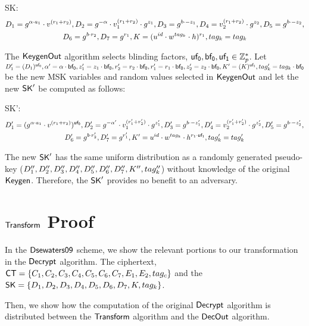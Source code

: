 \documentclass[11pt]{article}
\begin{document}
\begin{description}
\item {\sf SK}: \begin{multline*}  \originalkey \end{multline*}
\end{description}

\noindent
The $\KeygenOut$ algorithm selects blinding factors, $\listofbfs \in \Zp^*$. Let $\keydefinitions$ be the new MSK variables and random values selected in $\KeygenOut$ and let the new $\SK'$ be computed as follows:

\begin{description}
\item {\sf SK'}: \begin{multline*}  \transformkey \end{multline*}
\end{description}

\noindent
The new $\SK'$ has the same uniform distribution as a randomly generated pseudo-key ($\pseudokey$) without knowledge of the original $\Keygen$. Therefore, the $\SK'$ provides no benefit to an adversary.

\section{$\Transform$ Proof}

In the ${\schemename}$ scheme, we show the relevant portions to our transformation in the $\Decrypt$ algorithm. The ciphertext, $\CT = \{\ciphertext\}$ and the $\SK = \{\secretkey\}$. 

\gutsofdecrypt

Then, we show how the computation of the original $\Decrypt$ algorithm is distributed between the $\Transform$ algorithm and the $\Decout$ algorithm.

\gutsoftransform
\end{document}
